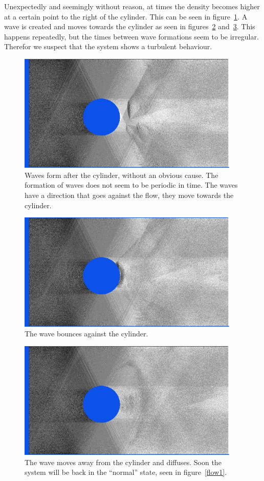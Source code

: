 \documentclass[12pt,a4paper]{article}
\begin{document}
Unexpectedly and seemingly without reason, at times the density becomes higher at a certain point to the right of the cylinder. This can be seen in figure~\ref{flow2}. A wave is created and moves towards the cylinder as seen in figures~\ref{flow3} and~\ref{flow4}. This happens repeatedly, but the times between wave formations seem to be irregular. Therefor we suspect that the system shows a turbulent behaviour.
\begin{figure}[htp]
\centering
  \includegraphics[width=300pt]{figs/scenario3mathexprintscreen10.png}
\caption{Waves form after the cylinder, without an obvious cause. The formation of waves does not seem to be periodic in time. The waves have a direction that goes against the flow, they move towards the cylinder.}
\label{flow2}
\end{figure}

\begin{figure}[htp]
\centering
  \includegraphics[width=300pt]{figs/scenario3mathexprintscreen5.png}
\caption{The wave bounces against the cylinder.}
\label{flow3}
\end{figure}

\begin{figure}[htp]
\centering
  \includegraphics[width=300pt]{figs/scenario3mathexprintscreen6.png}
\caption{The wave moves away from the cylinder and diffuses. Soon the system will be back in the ``normal'' state, seen in figure~\ref{flow1}.}
\label{flow4}
\end{figure}
\end{document}
